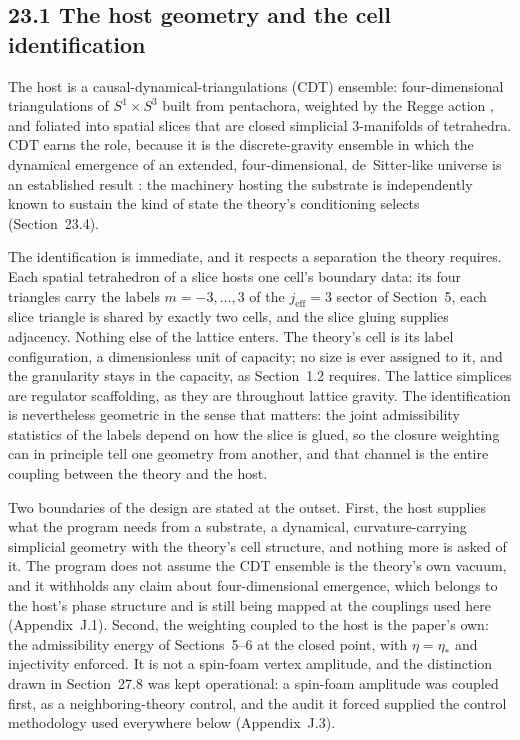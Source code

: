 \documentclass[11pt]{article}
\begin{document}
\subsection{23.1 The host geometry and the cell identification}

The host is a causal-dynamical-triangulations (CDT) ensemble: four-dimensional triangulations of $S^1\times S^3$ built from pentachora, weighted by the Regge action \citep{Regge1961}, and foliated into spatial slices that are closed simplicial $3$-manifolds of tetrahedra. CDT earns the role, because it is the discrete-gravity ensemble in which the dynamical emergence of an extended, four-dimensional, de~Sitter-like universe is an established result \citep{AmbjornJurkiewiczLoll2004,AmbjornGJL2012}: the machinery hosting the substrate is independently known to sustain the kind of state the theory's conditioning selects (Section~23.4).

The identification is immediate, and it respects a separation the theory requires. Each spatial tetrahedron of a slice hosts one cell's boundary data: its four triangles carry the labels $m=-3,\ldots,3$ of the $j_{\mathrm{eff}}=3$ sector of Section~5, each slice triangle is shared by exactly two cells, and the slice gluing supplies adjacency. Nothing else of the lattice enters. The theory's cell is its label configuration, a dimensionless unit of capacity; no size is ever assigned to it, and the granularity stays in the capacity, as Section~1.2 requires. The lattice simplices are regulator scaffolding, as they are throughout lattice gravity. The identification is nevertheless geometric in the sense that matters: the joint admissibility statistics of the labels depend on how the slice is glued, so the closure weighting can in principle tell one geometry from another, and that channel is the entire coupling between the theory and the host.

Two boundaries of the design are stated at the outset. First, the host supplies what the program needs from a substrate, a dynamical, curvature-carrying simplicial geometry with the theory's cell structure, and nothing more is asked of it. The program does not assume the CDT ensemble is the theory's own vacuum, and it withholds any claim about four-dimensional emergence, which belongs to the host's phase structure and is still being mapped at the couplings used here (Appendix~J.1). Second, the weighting coupled to the host is the paper's own: the admissibility energy of Sections~5--6 at the closed point, with $\eta=\eta_*$ and injectivity enforced. It is not a spin-foam vertex amplitude, and the distinction drawn in Section~27.8 was kept operational: a spin-foam amplitude was coupled first, as a neighboring-theory control, and the audit it forced supplied the control methodology used everywhere below (Appendix~J.3).
\end{document}
